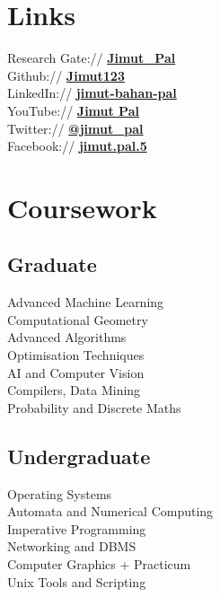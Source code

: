 \documentclass[]{deedy-resume-openfont}
\begin{document}
\begin{minipage}[t]{0.33\textwidth}

\section{Links} 
Research Gate://  \href{https://www.researchgate.net/profile/Jimut_Pal}{\bf Jimut\_Pal} \\
Github:// \href{https://github.com/Jimut123}{\bf Jimut123} \\
LinkedIn://  \href{https://www.linkedin.com/in/jimut-bahan-pal-156862123/}{\bf jimut-bahan-pal} \\
YouTube://  \href{https://www.youtube.com/channel/UCCy7zhn66c0TT-tDAcenKfA?view_as=subscriber}{\bf Jimut Pal} \\
Twitter://  \href{https://twitter.com/jimut_pal}{\bf @jimut\_pal} \\
Facebook:// \href{https://www.facebook.com/jimut.pal.5}{\bf jimut.pal.5} \\


\section{Coursework}
\subsection{Graduate}
Advanced Machine Learning \\
Computational Geometry \\
Advanced Algorithms \\
Optimisation Techniques \\
AI and Computer Vision \\
Compilers, Data Mining \\
Probability and Discrete Maths \\

\sectionsep

\subsection{Undergraduate}
Operating Systems \\
Automata and Numerical Computing \\
Imperative Programming \\
Networking and DBMS \\
Computer Graphics + Practicum \\
Unix Tools and Scripting \\


\end{minipage}
\end{document}
